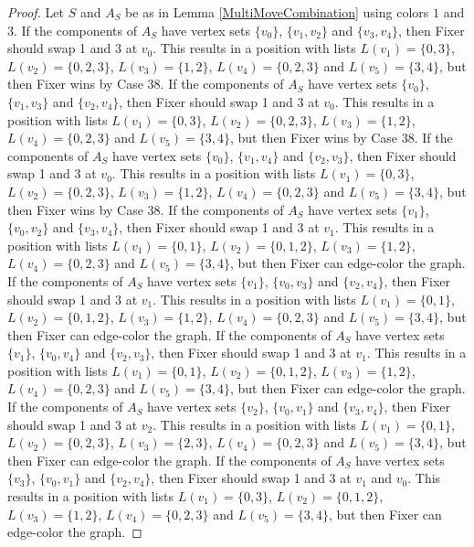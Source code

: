 \documentclass[12pt]{amsart}
\theoremstyle{plain}
\theoremstyle{definition}
\theoremstyle{remark}
\begin{document}
\begin{proof}
Let $S$ and $A_S$ be as in Lemma \ref{MultiMoveCombination} using colors $1$ and $3$. If the components of $A_S$ have vertex sets $\{v_0\}$, $\{v_1, v_2\}$ and $\{v_3, v_4\}$, then Fixer should swap 1 and 3 at $v_0$. This results in a position with lists $L(v_1) = \{0, 3\}$, $L(v_2) = \{0, 2, 3\}$, $L(v_3) = \{1, 2\}$, $L(v_4) = \{0, 2, 3\}$ and $L(v_5) = \{3, 4\}$, but then Fixer wins by Case 38.
If the components of $A_S$ have vertex sets $\{v_0\}$, $\{v_1, v_3\}$ and $\{v_2, v_4\}$, then Fixer should swap 1 and 3 at $v_0$. This results in a position with lists $L(v_1) = \{0, 3\}$, $L(v_2) = \{0, 2, 3\}$, $L(v_3) = \{1, 2\}$, $L(v_4) = \{0, 2, 3\}$ and $L(v_5) = \{3, 4\}$, but then Fixer wins by Case 38.
If the components of $A_S$ have vertex sets $\{v_0\}$, $\{v_1, v_4\}$ and $\{v_2, v_3\}$, then Fixer should swap 1 and 3 at $v_0$. This results in a position with lists $L(v_1) = \{0, 3\}$, $L(v_2) = \{0, 2, 3\}$, $L(v_3) = \{1, 2\}$, $L(v_4) = \{0, 2, 3\}$ and $L(v_5) = \{3, 4\}$, but then Fixer wins by Case 38.
If the components of $A_S$ have vertex sets $\{v_1\}$, $\{v_0, v_2\}$ and $\{v_3, v_4\}$, then Fixer should swap 1 and 3 at $v_1$. This results in a position with lists $L(v_1) = \{0, 1\}$, $L(v_2) = \{0, 1, 2\}$, $L(v_3) = \{1, 2\}$, $L(v_4) = \{0, 2, 3\}$ and $L(v_5) = \{3, 4\}$, but then Fixer can edge-color the graph.
If the components of $A_S$ have vertex sets $\{v_1\}$, $\{v_0, v_3\}$ and $\{v_2, v_4\}$, then Fixer should swap 1 and 3 at $v_1$. This results in a position with lists $L(v_1) = \{0, 1\}$, $L(v_2) = \{0, 1, 2\}$, $L(v_3) = \{1, 2\}$, $L(v_4) = \{0, 2, 3\}$ and $L(v_5) = \{3, 4\}$, but then Fixer can edge-color the graph.
If the components of $A_S$ have vertex sets $\{v_1\}$, $\{v_0, v_4\}$ and $\{v_2, v_3\}$, then Fixer should swap 1 and 3 at $v_1$. This results in a position with lists $L(v_1) = \{0, 1\}$, $L(v_2) = \{0, 1, 2\}$, $L(v_3) = \{1, 2\}$, $L(v_4) = \{0, 2, 3\}$ and $L(v_5) = \{3, 4\}$, but then Fixer can edge-color the graph.
If the components of $A_S$ have vertex sets $\{v_2\}$, $\{v_0, v_1\}$ and $\{v_3, v_4\}$, then Fixer should swap 1 and 3 at $v_2$. This results in a position with lists $L(v_1) = \{0, 1\}$, $L(v_2) = \{0, 2, 3\}$, $L(v_3) = \{2, 3\}$, $L(v_4) = \{0, 2, 3\}$ and $L(v_5) = \{3, 4\}$, but then Fixer can edge-color the graph.
If the components of $A_S$ have vertex sets $\{v_3\}$, $\{v_0, v_1\}$ and $\{v_2, v_4\}$, then Fixer should swap 1 and 3 at $v_1$ and $v_0$. This results in a position with lists $L(v_1) = \{0, 3\}$, $L(v_2) = \{0, 1, 2\}$, $L(v_3) = \{1, 2\}$, $L(v_4) = \{0, 2, 3\}$ and $L(v_5) = \{3, 4\}$, but then Fixer can edge-color the graph.

\end{proof}
\end{document}

